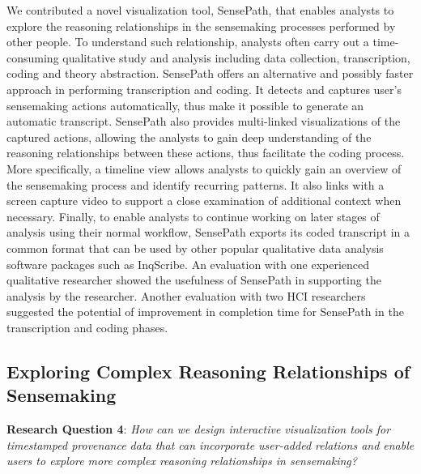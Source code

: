 We contributed a novel visualization tool, SensePath, that enables analysts to explore the reasoning relationships in the sensemaking processes performed by other people. To understand such relationship, analysts often carry out a time-consuming qualitative study and analysis including data collection, transcription, coding and theory abstraction. SensePath offers an alternative and possibly faster approach in performing transcription and coding. It detects and captures user's sensemaking actions automatically, thus make it possible to generate an automatic transcript. SensePath also provides multi-linked visualizations of the captured actions, allowing the analysts to gain deep understanding of the reasoning relationships between these actions, thus facilitate the coding process. More specifically, a timeline view allows analysts to quickly gain an overview of the sensemaking process and identify recurring patterns. It also links with a screen capture video to support a close examination of additional context when necessary. Finally, to enable analysts to continue working on later stages of analysis using their normal workflow, SensePath exports its coded transcript in a common format that can be used by other popular qualitative data analysis software packages such as InqScribe. An evaluation with one experienced qualitative researcher showed the usefulness of SensePath in supporting the analysis by the researcher. Another evaluation with two HCI researchers suggested the potential of improvement in completion time for SensePath in the transcription and coding phases.

\subsection{Exploring Complex Reasoning Relationships of Sensemaking}
\textbf{Research Question 4}: \emph{How can we design interactive visualization tools for timestamped provenance data that can incorporate user-added relations and enable users to explore more complex reasoning relationships in sensemaking?}

